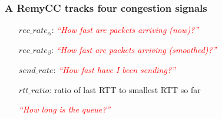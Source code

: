 \documentclass[svgnames]{beamer}
\begin{document}
\begin{frame}
\frametitle{A RemyCC tracks four congestion signals}

\large

\hspace{0.5 cm}\begin{minipage}{10.0 cm}
\begin{itemize}

\item[$rec\_rate_\alpha$:] \textcolor{Red}{\textit{``How fast are packets arriving (now)?''}}

\item[$rec\_rate_\beta$:] \textcolor{Red}{\textit{``How fast are packets arriving (smoothed)?''}}

\item[]

\item[$send\_rate$:] \textcolor{Red}{\textit{``How fast have I been sending?''}}

\item[]

\item[$rtt\_ratio$:] ratio of last RTT to smallest RTT so far

\textcolor{Red}{\textit{``How long is the queue?''}}

\end{itemize}
\end{minipage}

\end{frame}
\end{document}
